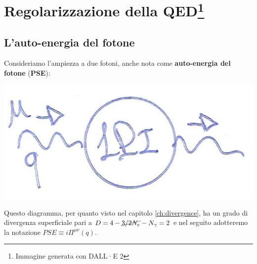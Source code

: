 \documentclass[../main.tex]{subfiles}
\begin{document}
\setchapterpreamble[u]{\margintoc}
\chapter[Regolarizzazione della QED]{Regolarizzazione della QED\footnote{Immagine generata con DALL·E 2}}
\label{qed_reg}
\fboxsep =1pt %

\section{L'auto-energia del fotone}
\label{sec:ph_selfenergy}

Consideriamo l'ampiezza a due fotoni, anche nota come \textbf{auto-energia del fotone} (\textbf{PSE}):

\includegraphics[]{images_ch2/photon_self_energy.JPG} 

Questo diagramma, per quanto visto nel capitolo \ref{ch:divergence}, ha un grado di divergenza superficiale pari a $D=4-\cancel{3/2N_e} - N_\gamma = 2$ e nel seguito adotteremo la notazione $\boxed{PSE \equiv i\Pi^{\mu\nu}(q)}$.
\end{document}
